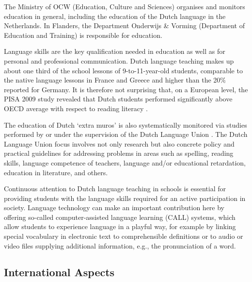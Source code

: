\documentclass[]{../../metanetpaper}
\begin{document}
\begin{multicols}{2}
The Ministry of OCW (Education, Culture and Sciences) organises and monitors education in general, including the education of the Dutch language in the Netherlands. In Flanders, the Department Onderwijs \& Vorming (Department of Education and Training) is responsible for education.

Language skills are the key qualification needed in education as well as for personal and professional communication. Dutch language teaching makes up about one third of the school lessons of 9-to-11-year-old students, comparable to the native language lessons in France and Greece and higher than the 20\% reported for Germany.  It is therefore not surprising that, on a European level, the PISA 2009 study revealed that Dutch students performed significantly above OECD average with respect to reading literacy \cite{Dataoecd}.

The education of Dutch `extra muros' is also systematically monitored via studies performed by or under the supervision of the Dutch Language Union \cite{NTUOnderwijs}.  The Dutch Language Union focus involves not only research but also concrete policy and practical guidelines for addressing problems in areas such as spelling, reading skills, language competence of teachers, language and/or educational retardation, education in literature, and others.



Continuous attention to Dutch language teaching in schools is essential for providing students with the language skills required for an active participation in society. Language technology can make an important contribution here by offering so-called computer-assisted language learning (CALL) systems, which allow students to experience language in a playful way, for example by linking special vocabulary in electronic text to comprehensible definitions or to audio or video files supplying additional information, e.g., the pronunciation of a word.

\subsection{International Aspects}


\end{multicols}
\end{document}
